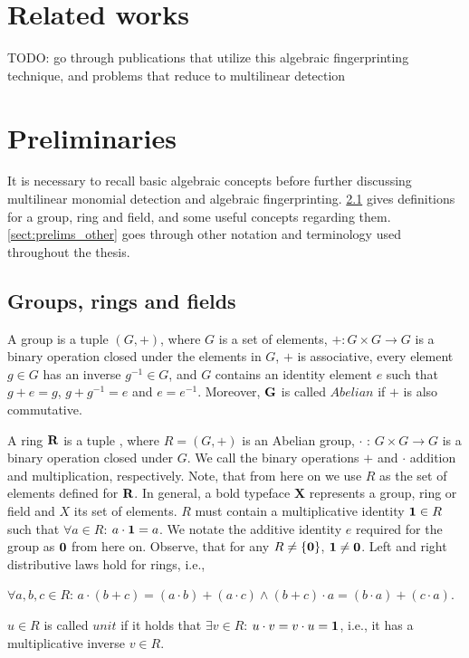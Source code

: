 \section{Related works} %
\label{sect:related_works}

TODO: go through publications that utilize this algebraic fingerprinting technique, 
and problems that reduce to multilinear detection
\clearpage

\section{Preliminaries}
\label{sect:prelims}

It is necessary to recall basic algebraic concepts 
before further discussing multilinear monomial detection and algebraic fingerprinting. 
\cref{sect:prelims_algebra} gives definitions for a group, ring and field, 
and some useful concepts regarding them. 
\cref{sect:prelims_other} goes through other notation and terminology used 
throughout the thesis.

\subsection{Groups, rings and fields} %
\label{sect:prelims_algebra}

A group 
is a tuple $(G, +)$, where $G$ is a set of elements,
$+ \colon G \times G \to G$
is a binary operation closed under 
the elements in $G$, $+$ is associative, every element $g\in G$ has an inverse $g^{-1}\in G$, and $G$ contains 
an identity element $e$ such that $g + e = g$, $g + g^{-1} = e$ and $e = e^{-1}$. Moreover, $\textbf G$ is called $Abelian$ if 
$+$ is also commutative.

A ring $\textbf R$ is a tuple
,
where $R = (G, +)$ is an Abelian group, $\cdot$ : $G \times G \longrightarrow G$ 
is a binary operation closed under $G$. We call the binary operations $+$ and
$\cdot$
addition and multiplication, respectively. 
Note, that from here on we use $R$ as the set of elements defined for $\textbf R$. 
In general, a bold typeface \textbf X represents a group, ring or field and $X$ its set of elements. 
$R$ must contain a multiplicative identity $\textbf 1 \in R$ such that $\forall a \in R$: $a \cdot \textbf 1 = a$. 
We notate the additive identity $e$ required for the group as $\textbf 0$ from here on. 
Observe, that for any $R \neq \{\textbf 0\}$, $\textbf 1 \neq \textbf 0$.  
Left and right distributive laws hold for rings, i.e., 
\begin{center}
  $\forall a, b, c \in R$: $a \cdot (b + c) = (a \cdot b) + (a \cdot c) \land (b + c) \cdot a = (b \cdot a) + (c \cdot a)$.
\end{center}
$u \in R$ is called $unit$ if it holds that $\exists v \in R$: $u \cdot v = v \cdot u = \textbf 1$, 
i.e., it has a multiplicative inverse $v \in R$.

